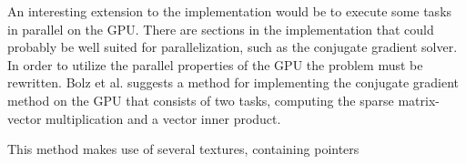 
An interesting extension to the implementation would be to execute some tasks in parallel on the GPU. There are sections in the implementation that could probably be well suited for parallelization, such as the conjugate gradient solver. In order to utilize the parallel properties of the GPU the problem must be rewritten. Bolz et al. \cite{gpu} suggests a method for implementing the conjugate gradient method on the GPU that consists of two tasks, computing the sparse matrix-vector multiplication and a vector inner product.

This method makes use of several textures, containing pointers 
